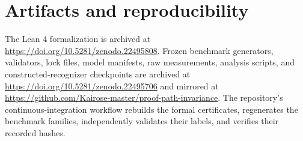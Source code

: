 \section{Artifacts and reproducibility}
The Lean 4 formalization is archived at
\url{https://doi.org/10.5281/zenodo.22495808}. Frozen benchmark generators,
validators, lock files, model manifests, raw measurements, analysis scripts,
and constructed-recognizer checkpoints are archived at
\url{https://doi.org/10.5281/zenodo.22495706} and mirrored at
\url{https://github.com/Kairose-master/proof-path-invariance}. The repository's
continuous-integration workflow rebuilds the formal certificates, regenerates
the benchmark families, independently validates their labels, and verifies
their recorded hashes.
